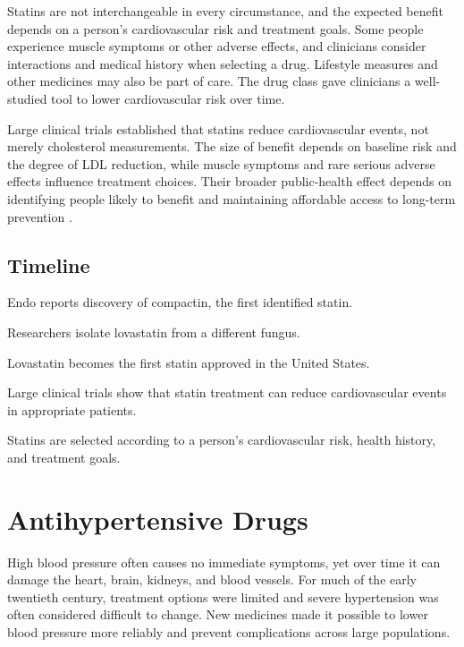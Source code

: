 \documentclass[12pt,oneside]{book}
\begin{document}
Statins are not interchangeable in every circumstance, and the expected
benefit depends on a person's cardiovascular risk and treatment goals.
Some people experience muscle symptoms or other adverse effects, and
clinicians consider interactions and medical history when selecting a
drug. Lifestyle measures and other medicines may also be part of care.
The drug class gave clinicians a well-studied tool to lower cardiovascular
risk over time.

Large clinical trials established that statins reduce cardiovascular events,
not merely cholesterol measurements. The size of benefit depends on baseline
risk and the degree of LDL reduction, while muscle symptoms and rare serious
adverse effects influence treatment choices. Their broader public-health
effect depends on identifying people likely to benefit and maintaining
affordable access to long-term prevention
\cite{statinHistory,fdaStatinHistory}.

\section*{Timeline}
\begin{description}[leftmargin=2.3cm,style=nextline]
  \item[1976] Endo reports discovery of compactin, the first identified statin.
  \item[1979] Researchers isolate lovastatin from a different fungus.
  \item[1987] Lovastatin becomes the first statin approved in the United States.
  \item[1990s onward] Large clinical trials show that statin treatment can reduce cardiovascular events in appropriate patients.
  \item[Today] Statins are selected according to a person's cardiovascular risk, health history, and treatment goals.
\end{description}
\chapter[Antihypertensive Drugs]{Antihypertensive Drugs}

High blood pressure often causes no immediate symptoms, yet over time it
can damage the heart, brain, kidneys, and blood vessels. For much of the
early twentieth century, treatment options were limited and severe
hypertension was often considered difficult to change. New medicines
made it possible to lower blood pressure more reliably and prevent
complications across large populations.
\end{document}
